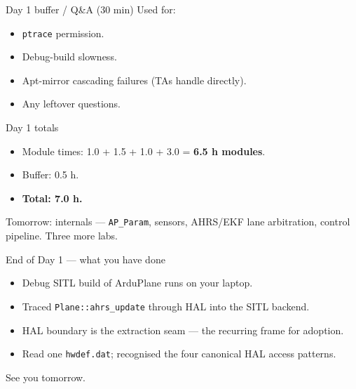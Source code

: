 \documentclass[aspectratio=169,11pt]{beamer}
\begin{document}
\begin{frame}[allowframebreaks]{Day 1 buffer / Q\&A (30 min)}
  Used for:
  \begin{itemize}
    \item \texttt{ptrace} permission.
    \item Debug-build slowness.
    \item Apt-mirror cascading failures (TAs handle directly).
    \item Any leftover questions.
  \end{itemize}
\end{frame}

\begin{frame}{Day 1 totals}
  \begin{itemize}
    \item Module times: 1.0 + 1.5 + 1.0 + 3.0 = \textbf{6.5 h modules}.
    \item Buffer: 0.5 h.
    \item \textbf{Total: 7.0 h.}
  \end{itemize}
  \vfill
  Tomorrow: internals --- \texttt{AP\_Param}, sensors, AHRS/EKF lane arbitration, control pipeline. Three more labs.
\end{frame}

\begin{frame}{End of Day 1 --- what you have done}
  \begin{itemize}
    \item Debug SITL build of ArduPlane runs on your laptop.
    \item Traced \texttt{Plane::ahrs\_update} through HAL into the SITL backend.
    \item HAL boundary is the extraction seam --- the recurring frame for adoption.
    \item Read one \texttt{hwdef.dat}; recognised the four canonical HAL access patterns.
  \end{itemize}
  \vfill
  \begin{center}\large See you tomorrow.\end{center}
\end{frame}
\end{document}

